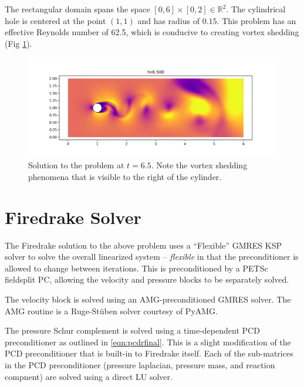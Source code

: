 \documentclass{article}
\begin{document}
The rectangular domain spans the space $\left[0,6\right]\times\left[0,2\right]\in\mathbb{R}^2$.  The cylindrical hole is centered at the point $\left(1,1\right)$ and has radius of $0.15$.  This problem has an effective Reynolds number of 62.5, which is conducive to creating vortex shedding (Fig \ref{fig:vortex}).
\begin{figure}[h]
  \includegraphics[width=\textwidth]{figures/vortex.png}
  \caption{Solution to the problem at $t=6.5$.  Note the vortex shedding phenomena that is visible to the right of the cylinder.}
  \label{fig:vortex}
\end{figure}

\section{Firedrake Solver}
The Firedrake\cite{Firedrake} solution to the above problem uses a ``Flexible'' GMRES KSP solver to solve the overall linearized system -- \textit{flexible} in that the preconditioner is allowed to change between iterations.  This is preconditioned by a PETSc fieldsplit PC, allowing the velocity and pressure blocks to be separately solved.

The velocity block is solved using an AMG-preconditioned GMRES solver.  The AMG routine is a Ruge-St\"uben solver courtesy of PyAMG\cite{OlSc2018}.

The pressure Schur complement is solved using a time-dependent PCD preconditioner as outlined in \eqref{eqn:pcdrfinal}.  This is a slight modification of the PCD preconditioner that is built-in to Firedrake itself.  Each of the sub-matrices in the PCD preconditioner (pressure laplacian, pressure mass, and reaction compnent) are solved using a direct LU solver.
\end{document}
